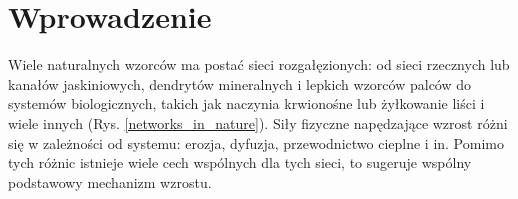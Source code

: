 \documentclass[]{pracamgr}
\begin{document}
  \tableofcontents

  \chapter*{Wprowadzenie}

    \setcounter{page}{1} 

    Wiele naturalnych wzorców ma postać sieci rozgałęzionych: od sieci rzecznych lub kanałów jaskiniowych, dendrytów mineralnych i lepkich wzorców palców do systemów biologicznych, takich jak naczynia krwionośne lub żyłkowanie liści i wiele innych (Rys. \ref{networks_in_nature}). Siły fizyczne napędzające wzrost różni się w zależności od systemu: erozja, dyfuzja, przewodnictwo cieplne i in. Pomimo tych różnic istnieje wiele cech wspólnych dla tych sieci, to sugeruje wspólny podstawowy mechanizm wzrostu.\par
\end{document}
